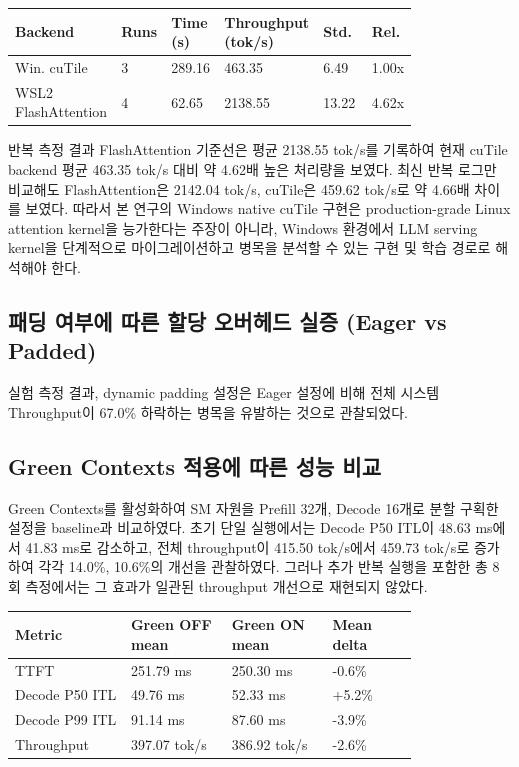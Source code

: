 \documentclass{kcc} %
\begin{document}
\begin{table}[h]
\centering
\scriptsize
\setlength{\tabcolsep}{2pt}
\begin{tabular}{|p{0.18\linewidth}|p{0.07\linewidth}|p{0.13\linewidth}|p{0.20\linewidth}|p{0.12\linewidth}|p{0.10\linewidth}|}
\hline
Backend & Runs & Time (s) & Throughput (tok/s) & Std. & Rel. \\ \hline
Win. cuTile & 3 & 289.16 & 463.35 & 6.49 & 1.00x \\ \hline
WSL2 FlashAttention & 4 & 62.65 & 2138.55 & 13.22 & 4.62x \\ \hline
\end{tabular}
\end{table}


반복 측정 결과 FlashAttention 기준선은 평균 2138.55 tok/s를 기록하여 현재 cuTile backend 평균 463.35 tok/s 대비 약 4.62배 높은 처리량을 보였다. 최신 반복 로그만 비교해도 FlashAttention은 2142.04 tok/s, cuTile은 459.62 tok/s로 약 4.66배 차이를 보였다. 따라서 본 연구의 Windows native cuTile 구현은 production-grade Linux attention kernel을 능가한다는 주장이 아니라, Windows 환경에서 LLM serving kernel을 단계적으로 마이그레이션하고 병목을 분석할 수 있는 구현 및 학습 경로로 해석해야 한다.


\subsection{패딩 여부에 따른 할당 오버헤드 실증 (Eager vs Padded)}

실험 측정 결과, dynamic padding 설정은 Eager 설정에 비해 전체 시스템 Throughput이 67.0\% 하락하는 병목을 유발하는 것으로 관찰되었다.


\subsection{Green Contexts 적용에 따른 성능 비교}

Green Contexts를 활성화하여 SM 자원을 Prefill 32개, Decode 16개로 분할 구획한 설정을 baseline과 비교하였다. 초기 단일 실행에서는 Decode P50 ITL이 48.63 ms에서 41.83 ms로 감소하고, 전체 throughput이 415.50 tok/s에서 459.73 tok/s로 증가하여 각각 14.0\%, 10.6\%의 개선을 관찰하였다. 그러나 추가 반복 실행을 포함한 총 8회 측정에서는 그 효과가 일관된 throughput 개선으로 재현되지 않았다.


\begin{table}[h]
\centering
\scriptsize
\setlength{\tabcolsep}{2pt}
\begin{tabular}{|p{0.23\linewidth}|p{0.20\linewidth}|p{0.20\linewidth}|p{0.17\linewidth}|}
\hline
Metric & Green OFF mean & Green ON mean & Mean delta \\ \hline
TTFT & 251.79 ms & 250.30 ms & -0.6\% \\ \hline
Decode P50 ITL & 49.76 ms & 52.33 ms & +5.2\% \\ \hline
Decode P99 ITL & 91.14 ms & 87.60 ms & -3.9\% \\ \hline
Throughput & 397.07 tok/s & 386.92 tok/s & -2.6\% \\ \hline
\end{tabular}
\end{table}
\end{document}
